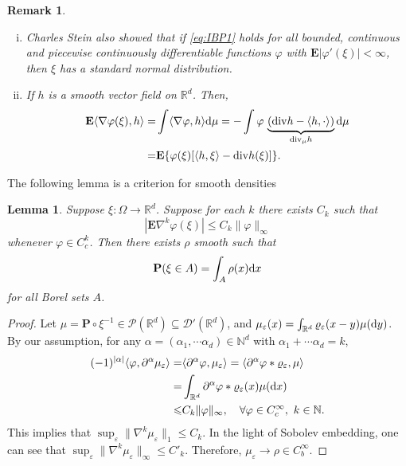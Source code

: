 \documentclass[twoside, 12pt]{book}
\numberwithin{equation}{chapter}
\newtheorem{lemma}[theorem]{Lemma}
\newtheorem{remark}[theorem]{Remark}
\def\mN{{\mathbb N}}
\def\mR{{\mathbb R}}
\def\bE{{\mathbf E}}
\def\bP{{\mathbf P}}
\def\sD{{\mathscr D}}
\def\sP{{\mathscr P}}
\def\<{\langle}
\def\>{\rangle}
\def\leq{\leqslant}
\def\d{\text{\rm{d}}}
\def\eps{\varepsilon}
\def\div{\mathord{{\rm div}}}
\begin{document}
    \begin{remark}
    	\begin{enumerate}[(i)]
    		\item Charles Stein also showed that if \eqref{eq:IBP1} holds for all bounded, continuous and piecewise continuously differentiable functions $\varphi$ with $\bE|\varphi'(\xi)|<\infty$, then $\xi$ has a standard normal distribution.
    		\item If $h$ is a smooth vector field on $\mR^d$. Then, 
    		\begin{equation}\label{eq:IBP2}
    			\begin{aligned}
    				\bE \< \nabla \varphi(\xi), h\> =& \int \<\nabla \varphi,h\>  \d \mu=-\int \varphi\,\underbrace{(\div h-\<h,\cdot\>)}_{\div_\mu h} \d \mu\\
    				=&\bE\{ \varphi(\xi) [\<h,\xi\>-\div h(\xi) ]\}. 
    			\end{aligned}
    		\end{equation}
    	\end{enumerate}
    \end{remark}

    The following lemma is a criterion for smooth densities 
    \begin{lemma}
        Suppose $\xi: \Omega \rightarrow \mathbb{R}^d$. Suppose for each $k$ there exists $C_k$ such that
        $$
         \left|\mathbf{E}\nabla^k \varphi(\xi)\right| \leq C_k\|\varphi\|_{\infty}
        $$
        whenever $\varphi \in C^k_c$. Then there exists $\rho$ smooth such that
        $$
        \mathbf{P}(\xi \in A)=\int_A \rho(x) \d x
        $$
        for all Borel sets $A$.
    \end{lemma}
    \begin{proof}
        Let $\mu=\bP\circ \xi^{-1}\in \sP(\mR^d)\subseteq\sD'(\mR^d)$, and $\mu_\eps(x)=\int_{\mR^d}\varrho_\eps(x-y)\mu(\d y)$. By our assumption, for any $\alpha=(\alpha_1,\cdots\alpha_d)\in \mN^d$ with $\alpha_1+\cdots\alpha_d=k$, 
        \[
        \begin{aligned}
            (-1)^{|\alpha|}\<\varphi, \partial^\alpha\mu_\eps\>=&\<\partial^\alpha \varphi, \mu_\eps\>=\<\partial^\alpha \varphi*\varrho_\eps, \mu\>\\
            =&\int_{\mR^d}\partial^\alpha \varphi*\varrho_\eps(x) \mu(\d x)\\
            \leq& C_k\|\varphi\|_\infty, \quad \forall \varphi\in C_c^\infty,~ k\in \mN.
        \end{aligned}
        \]
         This implies that $\sup_{\eps} \|\nabla^k\mu_\eps\|_1\leq C_k$. In the light of Sobolev embedding, one can see that $\sup_{\eps}\|\nabla^k\mu_\eps\|_\infty\leq C'_k$. Therefore, $\mu_\eps\to \rho\in C_b^\infty$. 
    \end{proof}
\end{document}

